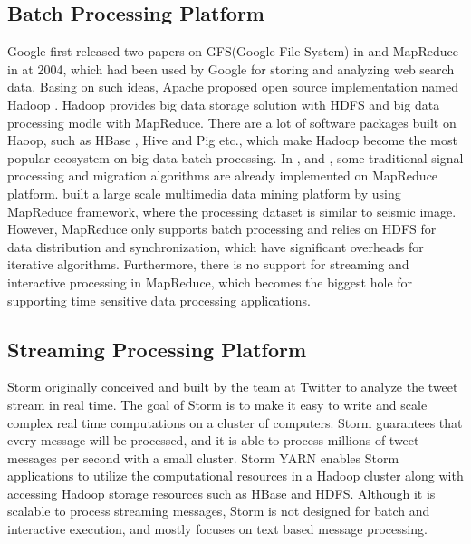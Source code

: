 \subsection{Batch Processing Platform}
Google first released two papers on GFS(Google File System) in \cite{GhemawatGFS945450} and MapReduce in \cite{DeanMSD1251264} at 2004, which had been used by Google for storing and analyzing web search data. Basing on such ideas, Apache proposed open source implementation named Hadoop \cite{ApacheHadoop}. Hadoop provides big data storage solution with HDFS and big data processing modle with MapReduce. There are a lot of software packages built on Haoop, such as HBase \cite{ApacheHBase}, Hive \cite{ApacheHive} and Pig \cite{ApachePig} etc., which make Hadoop become the most popular ecosystem on big data batch processing. In \cite{2432874MohammadzaheriDISRAYMapReduce}, \cite{6118958RizvandiMapRecudePKTM} and \cite{2745578AddairSeismicSignalHadoop}, some traditional signal processing and migration algorithms are already implemented on MapReduce platform. \cite{6427595WangMultimediaMapReduce} built a large scale multimedia data mining platform by using MapReduce framework, where the processing dataset is similar to seismic image. However,  MapReduce only supports batch processing and relies on HDFS for data distribution and synchronization, which have significant overheads for iterative algorithms. Furthermore, there is no support for streaming and interactive processing in MapReduce, which becomes the biggest hole for supporting time sensitive data processing applications.

\subsection{Streaming Processing Platform}
Storm \cite{ApacheStorm} originally conceived and built by the team at Twitter to analyze the tweet stream in real time. The goal of Storm is to make it easy to write and scale complex real time computations on a cluster of computers. Storm guarantees that every message will be processed, and it is able to process millions of tweet messages per second with a small cluster. 
Storm YARN enables Storm applications to utilize the computational resources in a Hadoop cluster along with accessing Hadoop storage resources such as HBase \cite{ApacheHBase} and HDFS. Although it is scalable to process streaming messages, Storm is not designed for batch and interactive execution, and mostly focuses on text based message processing. 

